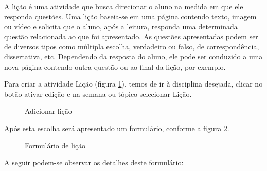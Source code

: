 A lição é uma atividade que busca direcionar o aluno na medida em que ele responda questões. Uma lição baseia-se em uma página contendo texto, imagem ou vídeo e solicita que o aluno, após a leitura, responda uma determinada questão relacionada ao que foi apresentado. As questões apresentadas podem ser de diversos tipos como múltipla escolha, verdadeiro ou falso, de correspondência, dissertativa, etc. Dependendo da resposta do aluno, ele pode ser conduzido a uma nova página contendo outra questão ou ao final da lição, por exemplo.

Para criar a atividade Lição (figura \ref{fig:add_licao}), temos de ir à disciplina desejada, clicar no botão ativar edição e na semana ou tópico selecionar Lição.

\begin{figure}
 \begin{center}
  \caption{Adicionar lição}
  \label{fig:add_licao}
 \end{center}
\end{figure}

Após esta escolha será apresentado um formulário, conforme a figura \ref{fig:form_licao}.

\begin{figure}
 \begin{center}
  \caption{Formulário de lição}
  \label{fig:form_licao}
 \end{center}
\end{figure}

A seguir podem-se observar os detalhes deste formulário:

